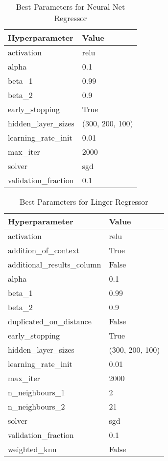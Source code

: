 \documentclass[a4paper, 12pt]{report}
\begin{document}
\begin{table}[H]
    \centering
    \caption{Best Parameters for Neural Net Regressor}
    \label{tab:best_parameters_neural_net_LRV1_Abalone}
    \begin{tabular}{|l|l|}
    \hline
    \textbf{Hyperparameter} & \textbf{Value} \\ \hline
    activation & relu \\ \hline
    alpha & 0.1 \\ \hline
    beta\_1 & 0.99 \\ \hline
    beta\_2 & 0.9 \\ \hline
    early\_stopping & True \\ \hline
    hidden\_layer\_sizes & (300, 200, 100) \\ \hline
    learning\_rate\_init & 0.01 \\ \hline
    max\_iter & 2000 \\ \hline
    solver & sgd \\ \hline
    validation\_fraction & 0.1 \\ \hline
    \end{tabular}
\end{table}

\begin{table}[H]
    \centering
    \caption{Best Parameters for Linger Regressor}
    \label{tab:best_parameters_linger_regressor_LRV1_Abalone}
    \begin{tabular}{|l|l|}
    \hline
    \textbf{Hyperparameter} & \textbf{Value} \\ \hline
    activation & relu \\ \hline
    addition\_of\_context & True \\ \hline
    additional\_results\_column & False \\ \hline
    alpha & 0.1 \\ \hline
    beta\_1 & 0.99 \\ \hline
    beta\_2 & 0.9 \\ \hline
    duplicated\_on\_distance & False \\ \hline
    early\_stopping & True \\ \hline
    hidden\_layer\_sizes & (300, 200, 100) \\ \hline
    learning\_rate\_init & 0.01 \\ \hline
    max\_iter & 2000 \\ \hline
    n\_neighbours\_1 & 2 \\ \hline
    n\_neighbours\_2 & 21 \\ \hline
    solver & sgd \\ \hline
    validation\_fraction & 0.1 \\ \hline
    weighted\_knn & False \\ \hline
    \end{tabular}
\end{table}
\end{document}
